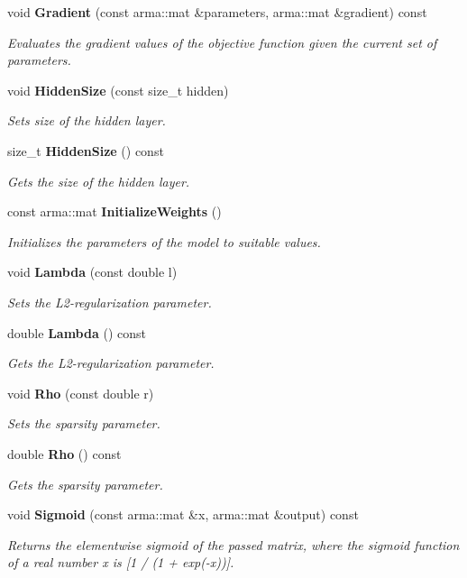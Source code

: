 \begin{DoxyCompactItemize}
void {\bf Gradient} (const arma\+::mat \&parameters, arma\+::mat \&gradient) const 
\begin{DoxyCompactList}\small\item\em Evaluates the gradient values of the objective function given the current set of parameters. \end{DoxyCompactList}\item 
void {\bf Hidden\+Size} (const size\+\_\+t hidden)
\begin{DoxyCompactList}\small\item\em Sets size of the hidden layer. \end{DoxyCompactList}\item 
size\+\_\+t {\bf Hidden\+Size} () const 
\begin{DoxyCompactList}\small\item\em Gets the size of the hidden layer. \end{DoxyCompactList}\item 
const arma\+::mat {\bf Initialize\+Weights} ()
\begin{DoxyCompactList}\small\item\em Initializes the parameters of the model to suitable values. \end{DoxyCompactList}\item 
void {\bf Lambda} (const double l)
\begin{DoxyCompactList}\small\item\em Sets the L2-\/regularization parameter. \end{DoxyCompactList}\item 
double {\bf Lambda} () const 
\begin{DoxyCompactList}\small\item\em Gets the L2-\/regularization parameter. \end{DoxyCompactList}\item 
void {\bf Rho} (const double r)
\begin{DoxyCompactList}\small\item\em Sets the sparsity parameter. \end{DoxyCompactList}\item 
double {\bf Rho} () const 
\begin{DoxyCompactList}\small\item\em Gets the sparsity parameter. \end{DoxyCompactList}\item 
void {\bf Sigmoid} (const arma\+::mat \&x, arma\+::mat \&output) const 
\begin{DoxyCompactList}\small\item\em Returns the elementwise sigmoid of the passed matrix, where the sigmoid function of a real number \textquotesingle{}x\textquotesingle{} is [1 / (1 + exp(-\/x))]. \end{DoxyCompactList}\item 

\end{DoxyCompactItemize}
